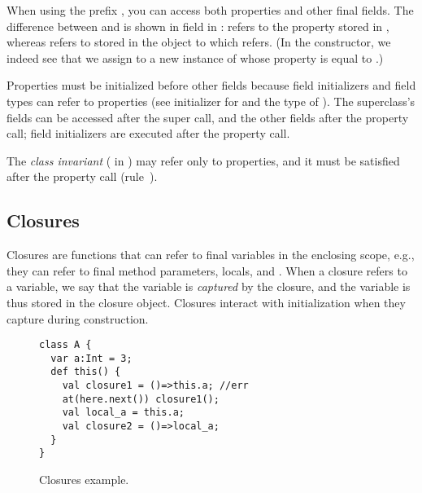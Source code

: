 When using the prefix \this, you can access both properties and other final fields.
The difference between \this and  is
    shown in field  in :
     refers to the property  stored in \this,
    whereas  refers to  stored in the object to which  refers.
(In the constructor, we indeed see that we assign to  a new instance of 
    whose  property is equal to .)


Properties must be initialized before other fields because
    field initializers and field types can refer to properties (see initializer for  and the type of ).
The superclass's fields can be accessed after the super call,
    and the other fields after the property call;
    field initializers are executed after the property call.

The \emph{class invariant} ( in )
    may refer only to properties,
    and it must be satisfied after the property call (rule~).



\subsection{Closures}
Closures are functions that can refer to final variables in the enclosing scope,
    e.g., they can refer to final method parameters, locals, and \this.
When a closure refers to a variable, we say that the variable is \emph{captured} by the closure,
    and the variable is thus stored in the closure object.
Closures interact with initialization when they capture \this during construction.

\begin{figure}
\vspace{-0.2cm}\begin{lstlisting}
class A {
  var a:Int = 3;
  def this() {
    val closure1 = ()=>this.a; //err
    at(here.next()) closure1();
    val local_a = this.a;
    val closure2 = ()=>local_a;
  }
}
\end{lstlisting}\vspace{-0.2cm}
\caption{Closures example.
    }
\label{Figure:Closures}
\end{figure}


